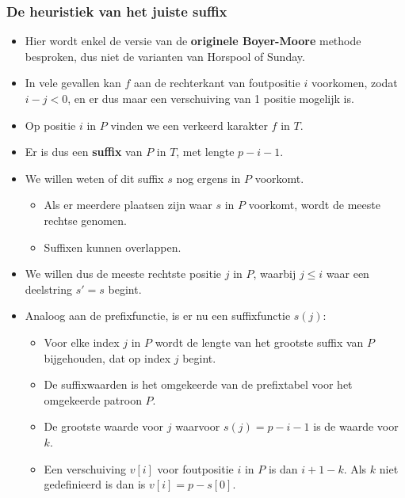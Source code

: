 \subsubsection{De heuristiek van het juiste suffix}
\begin{itemize}
    \item Hier wordt enkel de versie van de \textbf{originele Boyer-Moore} methode besproken, dus niet de varianten van Horspool of Sunday.
    \item In vele gevallen kan $f$ aan de rechterkant van foutpositie $i$ voorkomen, zodat $i - j < 0$, en er dus maar een verschuiving van 1 positie mogelijk is.
    \item Op positie $i$ in $P$ vinden we een verkeerd karakter $f$ in $T$.
    \item Er is dus een \textbf{suffix} van $P$ in $T$, met lengte $p - i - 1$.
    \item We willen weten of dit suffix $s$ nog ergens in $P$ voorkomt.
    \begin{itemize}
        \item Als er meerdere plaatsen zijn waar $s$ in $P$ voorkomt, wordt de meeste rechtse genomen.
        \item Suffixen kunnen overlappen.
    \end{itemize}
    \item We willen dus de meeste rechtste positie $j$ in $P$, waarbij $j \leq i$ waar een deelstring $s' = s$ begint.
    \item Analoog aan de prefixfunctie, is er nu een suffixfunctie $s(j)$:
    \begin{itemize}
        \item Voor elke index $j$ in $P$ wordt de lengte van het grootste suffix van $P$ bijgehouden, dat op index $j$ begint.
        \item De suffixwaarden is het omgekeerde van de prefixtabel voor het omgekeerde patroon $P$.
        \item De grootste waarde voor $j$ waarvoor $s(j) = p - i - 1$ is de waarde voor $k$.
        \item Een verschuiving $v[i]$ voor foutpositie $i$ in $P$ is dan $i + 1 - k$. Als $k$ niet gedefinieerd is dan is $v[i] = p - s[0]$.
    \end{itemize}


\end{itemize}
